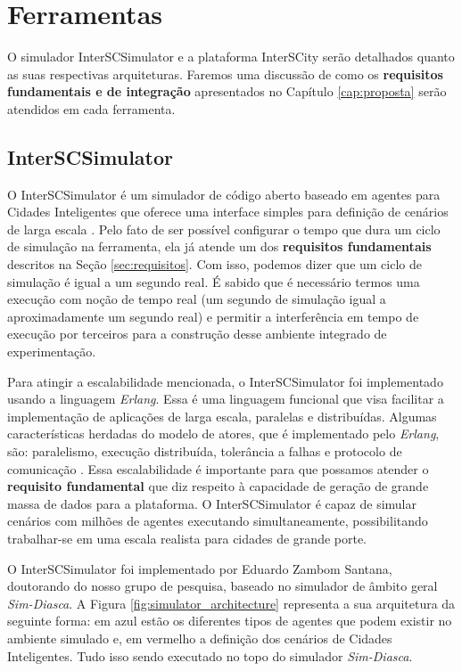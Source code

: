 \section{Ferramentas}

O simulador InterSCSimulator e a plataforma InterSCity serão detalhados quanto as suas respectivas arquiteturas.
Faremos uma discussão de como os \textbf{requisitos fundamentais e de integração} apresentados no Capítulo \ref{cap:proposta} serão atendidos em cada ferramenta.

\subsection{InterSCSimulator}

O InterSCSimulator é um simulador de código aberto baseado em agentes para Cidades Inteligentes que oferece uma interface simples para definição de
cenários de larga escala \citep{santana_17}.
Pelo fato de ser possível configurar o tempo que dura um ciclo de simulação na ferramenta, ela já atende um dos \textbf{requisitos fundamentais} descritos na Seção \ref{sec:requisitos}.
Com isso, podemos dizer que um ciclo de simulação é igual a um segundo real.
É sabido que é necessário termos uma execução com noção de tempo real (um segundo de simulação igual a aproximadamente um segundo real) e permitir a
interferência em tempo de execução por terceiros para a construção desse ambiente integrado de experimentação.

Para atingir a escalabilidade mencionada, o InterSCSimulator foi implementado usando a linguagem \textit{Erlang}.
Essa é uma linguagem funcional que visa facilitar a implementação de aplicações de larga escala, paralelas e distribuídas.
Algumas características herdadas do modelo de atores, que é implementado pelo \textit{Erlang}, são: paralelismo, execução distribuída, tolerância a falhas e
protocolo de comunicação \citep{santana_17}.
Essa escalabilidade é importante para que possamos atender o \textbf{requisito fundamental} que diz respeito à capacidade de geração de grande massa de dados
para a plataforma.
O InterSCSimulator é capaz de simular cenários com milhões de agentes executando simultaneamente, possibilitando trabalhar-se em uma escala realista para cidades de grande porte.

O InterSCSimulator foi implementado por Eduardo Zambom Santana, doutorando do nosso grupo de pesquisa, baseado no simulador de âmbito geral \textit{Sim-Diasca}.
A Figura \ref{fig:simulator_architecture} representa a sua arquitetura da seguinte forma: em azul estão os diferentes tipos de agentes que podem existir no ambiente
simulado e, em vermelho a definição dos cenários de Cidades Inteligentes.
Tudo isso sendo executado no topo do simulador \textit{Sim-Diasca}.

